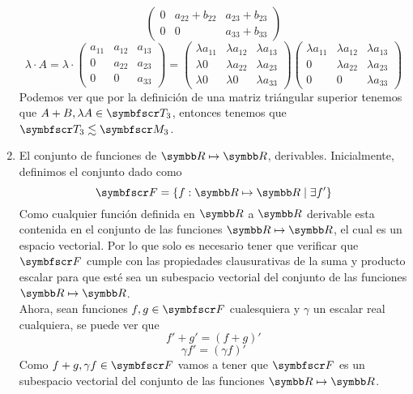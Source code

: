 \begin{enumerate}[label=\listAlph]
\[\begin{pmatrix}
                    0 & a_{22} + b_{22} & a_{23} + b_{23} \\
                    0 & 0 & a_{33} + b_{33}
                \end{pmatrix}
            \]
            \[
                \lambda \cdot A =
                \lambda \cdot 
                \begin{pmatrix}
                    a_{11} & a_{12} & a_{13} \\
                    0 & a_{22} & a_{23} \\
                    0 & 0 & a_{33}
                \end{pmatrix}
                =
                \begin{pmatrix}
                    \lambda a_{11} & \lambda a_{12} & \lambda a_{13} \\
                    \lambda 0 & \lambda a_{22} & \lambda a_{23} \\
                    \lambda 0 & \lambda 0 & \lambda a_{33}
                \end{pmatrix}
                \begin{pmatrix}
                    \lambda a_{11} & \lambda a_{12} & \lambda a_{13} \\
                    0 & \lambda a_{22} & \lambda a_{23} \\
                    0 & 0 & \lambda a_{33}
                \end{pmatrix}
            \]
            Podemos ver que por la definición de una matriz triángular superior tenemos que 
            \(A + B, \lambda A \in \ft_3\), entonces tenemos que \(\ft_3 \lesssim \fm_3\).
        \item El conjunto de funciones de \(\realR \mapsto \realR\), derivables.
            Inicialmente, definimos el conjunto dado como
            \[
                \ff = \left\{ f: \realR \mapsto \realR \mid \exists f'\right\}
            \]
            Como cualquier función definida en \(\realR\) a \(\realR\) derivable esta contenida en el 
            conjunto de las funciones \(\realR \mapsto \realR\), el cual es un espacio vectorial. 
            Por lo que solo es necesario tener que verificar que \(\ff\) cumple con las propiedades clausurativas 
            de la suma y producto escalar para que esté sea un subespacio vectorial del conjunto de las funciones \(\realR \mapsto \realR\).
            \\
            Ahora, sean funciones \(f, g \in \ff\) cualesquiera y \(\gamma\) un escalar real cualquiera,
            se puede ver que 
            \[
                f' + g' = \left(f + g\right)'
            \]
            \[
                \gamma f' = \left(\gamma f\right)'
            \]
            Como \(f + g, \gamma f \in \ff\) vamos a tener que \(\ff\) es un subespacio vectorial del conjunto de las funciones \(\realR \mapsto \realR\).
    \end{enumerate}
